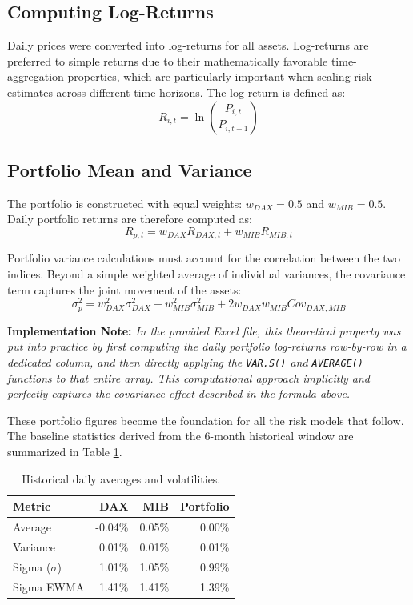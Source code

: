 \documentclass{report}
\begin{document}
\subsection{Computing Log-Returns}
Daily prices were converted into log-returns for all assets. Log-returns are preferred to simple returns due to their mathematically favorable time-aggregation properties, which are particularly important when scaling risk estimates across different time horizons. The log-return is defined as:
\[ R_{i,t} = \ln\left(\frac{P_{i,t}}{P_{i,t-1}}\right) \]

\subsection{Portfolio Mean and Variance}
The portfolio is constructed with equal weights: $w_{DAX} = 0.5$ and $w_{MIB} = 0.5$. Daily portfolio returns are therefore computed as:
\[ R_{p,t} = w_{DAX} R_{DAX,t} + w_{MIB} R_{MIB,t} \]

Portfolio variance calculations must account for the correlation between the two indices. Beyond a simple weighted average of individual variances, the covariance term captures the joint movement of the assets:
\[ \sigma_p^2 = w_{DAX}^2 \sigma_{DAX}^2 + w_{MIB}^2 \sigma_{MIB}^2 + 2 w_{DAX} w_{MIB} Cov_{DAX, MIB} \]

\textbf{Implementation Note:} \textit{In the provided Excel file, this theoretical property was put into practice by first computing the daily portfolio log-returns row-by-row in a dedicated column, and then directly applying the \texttt{VAR.S()} and \texttt{AVERAGE()} functions to that entire array. This computational approach implicitly and perfectly captures the covariance effect described in the formula above.}

These portfolio figures become the foundation for all the risk models that follow. The baseline statistics derived from the 6-month historical window are summarized in Table \ref{tab:basestats}.

\begin{table}[H]
    \centering
    \begin{tabular}{lrrr}
        \toprule
        \textbf{Metric} & \textbf{DAX} & \textbf{MIB} & \textbf{Portfolio} \\
        \midrule
        Average & -0.04\% & 0.05\% & 0.00\% \\
        Variance & 0.01\% & 0.01\% & 0.01\% \\
        Sigma ($\sigma$) & 1.01\% & 1.05\% & 0.99\% \\
        Sigma EWMA & 1.41\% & 1.41\% & 1.39\% \\
        \bottomrule
    \end{tabular}
    \caption{Historical daily averages and volatilities.}
    \label{tab:basestats}
\end{table}
\end{document}
